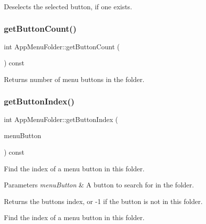 Deselects the selected button, if one exists. \mbox{\label{classAppMenuFolder_a74c22a106dbef4a9e66cb5ec8a6f402e}} 
\subsubsection{\texorpdfstring{get\+Button\+Count()}{getButtonCount()}}
{\footnotesize\ttfamily int App\+Menu\+Folder\+::get\+Button\+Count (\begin{DoxyParamCaption}{ }\end{DoxyParamCaption}) const}

\begin{DoxyReturn}{Returns}
number of menu buttons in the folder. 
\end{DoxyReturn}
\mbox{\label{classAppMenuFolder_a82cefa07059bc6f6208024f6310a82fd}} 
\subsubsection{\texorpdfstring{get\+Button\+Index()}{getButtonIndex()}}
{\footnotesize\ttfamily int App\+Menu\+Folder\+::get\+Button\+Index (\begin{DoxyParamCaption}\item[{\mbox{\hyperlink{classAppMenuButton_aeb692efb6a933970de8eac14e5e71544}{App\+Menu\+Button\+::\+Ptr}}}]{menu\+Button }\end{DoxyParamCaption}) const}

Find the index of a menu button in this folder.


\begin{DoxyParams}{Parameters}
{\em menu\+Button} & A button to search for in the folder.\\
\hline
\end{DoxyParams}
\begin{DoxyReturn}{Returns}
the button\textquotesingle{}s index, or -\/1 if the button is not in this folder.
\end{DoxyReturn}
Find the index of a menu button in this folder. \mbox{\label{classAppMenuFolder_a5f434395b72ae4de65d4941024e96017}} 
